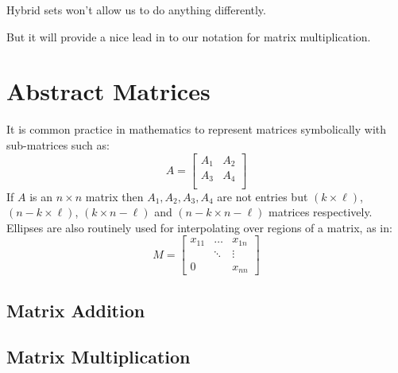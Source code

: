 Hybrid sets won't allow us to do anything differently.

But it will provide a nice lead in to our notation for matrix multiplication.




%
%
\section{Abstract Matrices}

It is common practice in mathematics to represent matrices symbolically with sub-matrices such as:
\begin{equation}
	A = \left[
		\begin{array}{ccc}
			A_1 & A_2 \\
			A_3 & A_4 \\
		\end{array}
	\right]
\end{equation}
If $A$ is an $n \times n$ matrix then $A_1, A_2, A_3, A_4$ are not entries but $(k \times \ell)$, $(n-k \times \ell)$, $(k \times n - \ell)$ and $(n-k \times n - \ell)$ matrices respectively.
Ellipses are also routinely used for interpolating over regions of a matrix, as in:
\begin{equation}
	M = \left[
		\begin{array}{ccc}
			x_{11} & \ldots & x_{1n} \\
			& \ddots & \vdots \\
			0 & & x_{nn}
		\end{array}
	\right]
\end{equation}

\subsection{Matrix Addition}


\subsection{Matrix Multiplication}


























